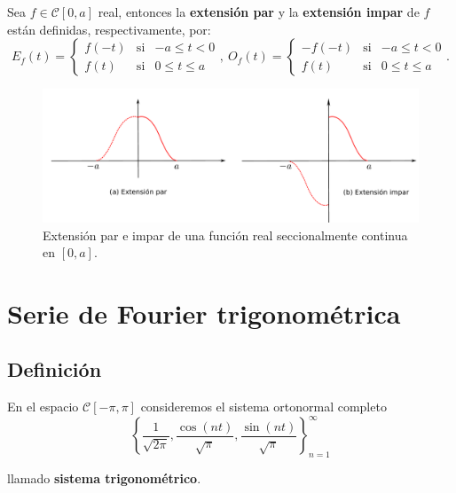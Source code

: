 \begin{defi}
Sea $f \in \mathcal{C}[0,a]$ real, entonces la \textbf{extensión par} y la \textbf{extensión impar} de $f$ están definidas, respectivamente, por:
\begin{equation*}
    E_f(t) = \left\{ \begin{array}{cll}
    f(-t)     & \mbox{si} & -a \leq t < 0 \\
    f(t)     & \mbox{si} & 0 \leq t \leq a
    \end{array} \right. , ~ O_f(t) = \left\{ \begin{array}{cll}
    -f(-t)     & \mbox{si} & -a \leq t < 0 \\
    f(t)     & \mbox{si} & 0 \leq t \leq a
    \end{array} \right. .
\end{equation*}
\end{defi}

\begin{figure}[H]
    \centering
    \includegraphics[scale = 0.45]{Figuras/Paridad.pdf}
    \caption{Extensión par e impar de una función real seccionalmente continua en $[0,a]$. }
\end{figure}

\section{Serie de Fourier trigonométrica}

\subsection{Definición}

En el espacio $\mathcal{C}[-\pi,\pi]$ consideremos el sistema ortonormal completo 
$$\left\{ \frac{1}{\sqrt{2\pi}}, \frac{\cos(nt)}{\sqrt{\pi}}, \frac{\sin(nt)}{\sqrt{\pi}} \right\}_{n=1}^{\infty}$$

llamado \textbf{sistema trigonométrico}.


